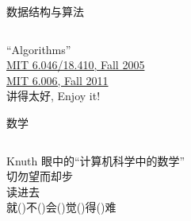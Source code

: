\begin{frame}{数据结构与算法}
  \begin{columns}
  \end{columns}

  \begin{center}
    ``Algorithms''\\[4pt]
    \href{http://open.163.com/special/opencourse/algorithms.html}{MIT 6.046/18.410, Fall 2005}\\[3pt]
    \href{https://ocw.mit.edu/courses/electrical-engineering-and-computer-science/6-006-introduction-to-algorithms-fall-2011/lecture-videos/}{MIT 6.006, Fall 2011}\\[10pt]

    讲得太好, Enjoy it!
  \end{center}
\end{frame}

\begin{frame}{数学}
  \begin{columns}
      \begin{center}
	Knuth 眼中的``计算机科学中的数学''\\[10pt]
	切勿望而却步\\[8pt]
	读进去\\
	就()不()会()觉()得()难\\[3pt]
      \end{center}
  \end{columns}
\end{frame}
